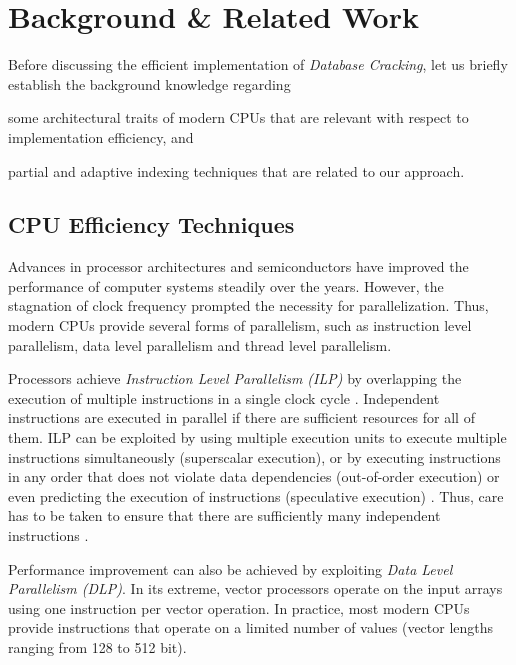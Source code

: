 \section{Background \& Related Work}
\label{sec:damon_related_work} 

Before discussing the efficient
implementation of \emph{Database Cracking}, let us briefly establish
the background knowledge regarding
\begin{inparaenum}[a)]
\item some architectural traits of modern CPUs that are relevant with
respect to implementation efficiency, and
\item partial and adaptive indexing techniques that are related to our
approach.
\end{inparaenum}

\subsection*{CPU Efficiency Techniques}
\label{sec:cpu-efficiency} Advances in processor architectures and
semiconductors have improved the performance of computer systems
steadily over the years.  However, the stagnation of clock frequency
prompted the necessity for parallelization.  Thus, modern CPUs provide
several forms of parallelism, such as instruction level parallelism,
data level parallelism and thread level parallelism.


Processors achieve \emph{Instruction Level Parallelism (ILP)} by
overlapping the execution of multiple instructions in a single clock
cycle \cite{DBLP:books/daglib/0068852}.  Independent instructions are
executed in parallel if there are sufficient resources for all of
them.  ILP can be exploited by using multiple execution units to
execute multiple instructions simultaneously (superscalar execution),
or by executing instructions in any order that does not violate data
dependencies (out-of-order execution) or even predicting the execution
of instructions (speculative execution)
\cite{DBLP:books/daglib/0028244}.  Thus, care has to be taken to
ensure that there are sufficiently many independent instructions
\cite{wheretime, DBLP:conf/cidr/BonczZN05}.

Performance improvement can also be achieved by exploiting \emph{Data
  Level Parallelism (DLP)}. In its extreme, vector processors operate
on the input arrays using one instruction per vector operation. In
practice, most modern CPUs provide \simd{} instructions that operate
on a limited number of values (vector lengths ranging from 128 to
512 bit).

